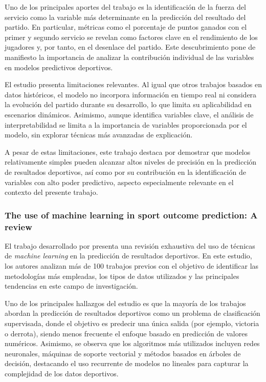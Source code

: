 Uno de los principales aportes del trabajo es la identificación de la fuerza del servicio como la variable más determinante en la predicción del resultado del partido. En particular, métricas como el porcentaje de puntos ganados con el primer y segundo servicio se revelan como factores clave en el rendimiento de los jugadores y, por tanto, en el desenlace del partido. Este descubrimiento pone de manifiesto la importancia de analizar la contribución individual de las variables en modelos predictivos deportivos.

El estudio presenta limitaciones relevantes. Al igual que otros trabajos basados en datos históricos, el modelo no incorpora información en tiempo real ni considera la evolución del partido durante su desarrollo, lo que limita su aplicabilidad en escenarios dinámicos. Asimismo, aunque identifica variables clave, el análisis de interpretabilidad se limita a la importancia de variables proporcionada por el modelo, sin explorar técnicas más avanzadas de explicación.

A pesar de estas limitaciones, este trabajo destaca por demostrar que modelos relativamente simples pueden alcanzar altos niveles de precisión en la predicción de resultados deportivos, así como por su contribución en la identificación de variables con alto poder predictivo, aspecto especialmente relevante en el contexto del presente trabajo.

\subsubsection{The use of machine learning in sport outcome prediction: A review}

El trabajo desarrollado por \cite{horvat2020review} presenta una revisión exhaustiva del uso de técnicas de \textit{machine learning} en la predicción de resultados deportivos. En este estudio, los autores analizan más de 100 trabajos previos con el objetivo de identificar las metodologías más empleadas, los tipos de datos utilizados y las principales tendencias en este campo de investigación.

Uno de los principales hallazgos del estudio es que la mayoría de los trabajos abordan la predicción de resultados deportivos como un problema de clasificación supervisada, donde el objetivo es predecir una única salida (por ejemplo, victoria o derrota), siendo menos frecuente el enfoque basado en predicción de valores numéricos. Asimismo, se observa que los algoritmos más utilizados incluyen redes neuronales, máquinas de soporte vectorial y métodos basados en árboles de decisión, destacando el uso recurrente de modelos no lineales para capturar la complejidad de los datos deportivos.

